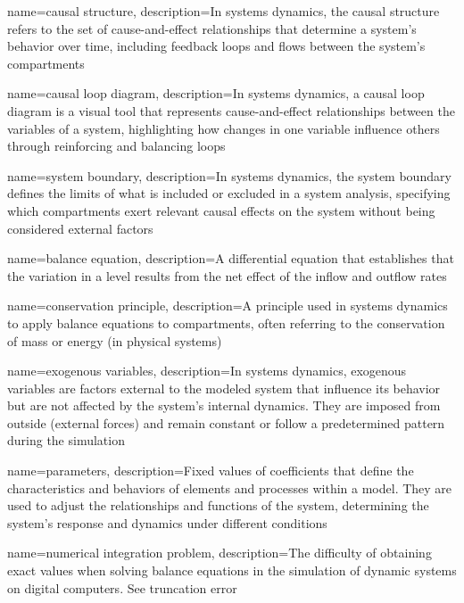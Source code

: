 {
    name=causal structure,
    description={In systems dynamics, the causal structure refers to the set of cause-and-effect relationships that determine a system's behavior over time, including feedback loops and flows between the system's compartments}
}

{
    name=causal loop diagram,
    description={In systems dynamics, a causal loop diagram is a visual tool that represents cause-and-effect relationships between the variables of a system, highlighting how changes in one variable influence others through reinforcing and balancing loops}
}

{
    name=system boundary,
    description={In systems dynamics, the system boundary defines the limits of what is included or excluded in a system analysis, specifying which compartments exert relevant causal effects on the system without being considered external factors}
}

{
    name=balance equation,
    description={A differential equation that establishes that the variation in a level results from the net effect of the inflow and outflow rates}
}

{
    name=conservation principle,
    description={A principle used in systems dynamics to apply balance equations to compartments, often referring to the conservation of mass or energy (in physical systems)}
}

{
    name=exogenous variables,
    description={In systems dynamics, exogenous variables are factors external to the modeled system that influence its behavior but are not affected by the system's internal dynamics. They are imposed from outside (external forces) and remain constant or follow a predetermined pattern during the simulation}
}

{
    name=parameters,
    description={Fixed values of coefficients that define the characteristics and behaviors of elements and processes within a model. They are used to adjust the relationships and functions of the system, determining the system's response and dynamics under different conditions}
}

{
    name=numerical integration problem,
    description={The difficulty of obtaining exact values when solving balance equations in the simulation of dynamic systems on digital computers. See truncation error}
}

